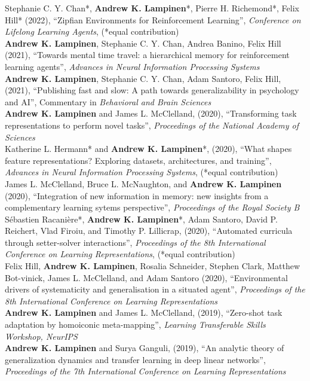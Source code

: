 \documentclass[margin]{res}
\begin{document}
\begin{resume}
{Stephanie C. Y. Chan*, \textbf{Andrew K. Lampinen}*, Pierre H. Richemond*, Felix Hill* (2022), {``Zipfian Environments for Reinforcement Learning'',} \textit{Conference on Lifelong Learning Agents}, (*equal contribution) \\[3pt] 
\textbf{Andrew K. Lampinen}, Stephanie C. Y. Chan, Andrea Banino, Felix Hill (2021), {``Towards mental time travel: a hierarchical memory for reinforcement learning agents'',} \textit{Advances in Neural Information Processing Systems} \\[3pt] 
\textbf{Andrew K. Lampinen}, Stephanie C. Y. Chan, Adam Santoro, Felix Hill, (2021), {``Publishing fast and slow: A path towards generalizability in psychology and AI'',} Commentary in \textit{Behavioral and Brain Sciences} \\[3pt] 
\textbf{Andrew K. Lampinen} and James L. McClelland, (2020), {``Transforming task representations to perform novel tasks'',} \textit{Proceedings of the National Academy of Sciences} \\[3pt] 
Katherine L. Hermann* and \textbf{Andrew K. Lampinen}*, (2020), {``What shapes feature representations? Exploring datasets, architectures, and training'',} \textit{Advances in Neural Information Processing Systems}, (*equal contribution) \\[3pt] 
James L. McClelland, Bruce L. McNaughton, and \textbf{Andrew K. Lampinen} (2020), {``Integration of new information in memory: new insights from a complementary learning sytems perspective''}, \textit{Proceedings of the Royal Society B} \\[3pt]
S\'ebastien Racani\`ere*, \textbf{Andrew K. Lampinen}*, Adam Santoro, David P. Reichert, Vlad Firoiu, and Timothy P. Lillicrap, (2020), {``Automated curricula through setter-solver interactions'',} \textit{Proceedings of the 8th International Conference on Learning Representations}, (*equal contribution) \\ [3pt] 
Felix Hill, \textbf{Andrew K. Lampinen}, Rosalia Schneider, Stephen Clark, Matthew Bot-vinick, James L. McClelland, and Adam Santoro (2020), {``Environmental drivers of systematicity and generalisation in a situated agent'',} \textit{Proceedings of the 8th International Conference on Learning Representations} \\ [3pt] 
\textbf{Andrew K. Lampinen} and James L. McClelland, (2019), {``Zero-shot task adaptation by homoiconic meta-mapping'',} \textit{Learning Transferable Skills Workshop, NeurIPS} \\ [3pt] 
\textbf{Andrew K. Lampinen} and Surya Ganguli, (2019), {``An analytic theory of generalization dynamics and transfer learning in deep linear networks'',} \textit{Proceedings of the 7th International Conference on Learning Representations} \\[3pt] 
}
\end{resume}
\end{document}
